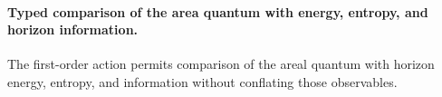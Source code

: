 \begin{HMTScientificOwnerSubordinated}

\end{HMTScientificOwnerSubordinated}

\paragraph{Typed comparison of the area quantum with energy, entropy, and horizon information.} The first-order action permits comparison of the areal quantum with horizon energy, entropy, and information without conflating those observables.
